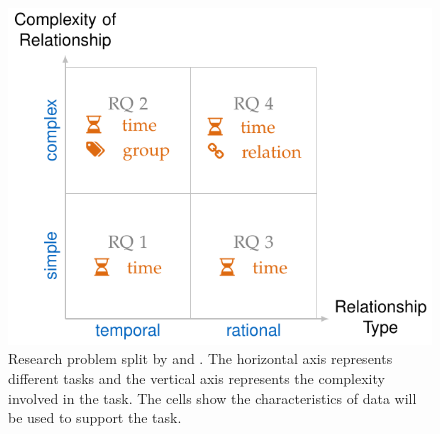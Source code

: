 \begin{figure}[!htb]
	\centering
	\includegraphics{work}
	\caption{Research problem split by  and . The horizontal axis represents different tasks and the vertical axis represents the complexity involved in the  task. The cells show the characteristics of data will be used to support the task.}
	\label{fig:intro-work}
\end{figure}


